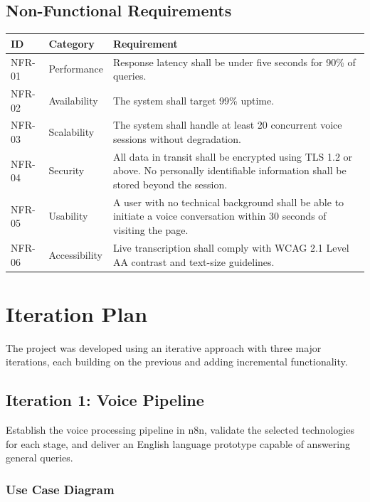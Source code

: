 \documentclass[12pt,a4paper]{report}
\begin{document}
\newpage
\subsection{Non-Functional Requirements}

\begin{longtable}{p{2cm} p{3.5cm} p{9cm}}
  \toprule
  \textbf{ID} & \textbf{Category}    & \textbf{Requirement} \\
  \midrule
  \endhead
  NFR-01 & Performance          & Response latency shall be under five seconds for 90\% of queries. \\[4pt]
  NFR-02 & Availability         & The system shall target 99\% uptime. \\[4pt]
  NFR-03 & Scalability          & The system shall handle at least 20 concurrent voice sessions without degradation. \\[4pt]
  NFR-04 & Security             & All data in transit shall be encrypted using TLS 1.2 or above. No personally identifiable information shall be stored beyond the session. \\[4pt]
  NFR-05 & Usability            & A user with no technical background shall be able to initiate a voice conversation within 30 seconds of visiting the page. \\[4pt]
  NFR-06 & Accessibility        & Live transcription shall comply with WCAG 2.1 Level AA contrast and text-size guidelines. \\[4pt]
  \bottomrule
\end{longtable}


\newpage
\section{Iteration Plan}

The project was developed using an iterative approach with three major
iterations, each building on the previous and adding incremental functionality.

\subsection{Iteration 1: Voice Pipeline}

Establish the voice processing pipeline in n8n, validate the selected technologies for each stage, and deliver an English language prototype capable of answering general queries.

\subsubsection{Use Case Diagram}
\end{document}
